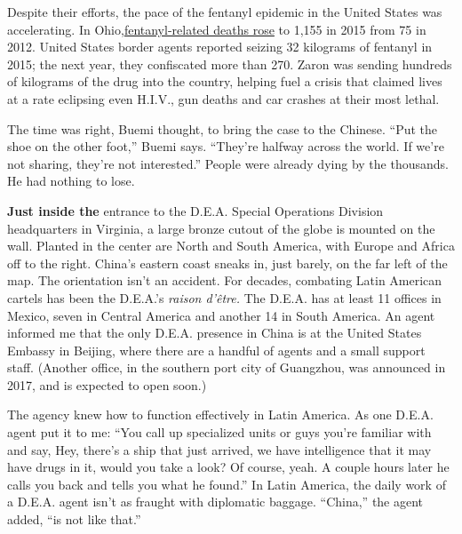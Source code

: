 Despite their efforts, the pace of the fentanyl epidemic in the United
States was accelerating. In
Ohio,\href{https://www.nytimes3xbfgragh.onion/2018/04/04/opinion/carfentanil-fentanyl-opioid-crisis.html}{fentanyl-related
deaths rose} to 1,155 in 2015 from 75 in 2012. United States border
agents reported seizing 32 kilograms of fentanyl in 2015; the next year,
they confiscated more than 270. Zaron was sending hundreds of kilograms
of the drug into the country, helping fuel a crisis that claimed lives
at a rate eclipsing even H.I.V., gun deaths and car crashes at their
most lethal.

The time was right, Buemi thought, to bring the case to the Chinese.
``Put the shoe on the other foot,'' Buemi says. ``They're halfway across
the world. If we're not sharing, they're not interested.'' People were
already dying by the thousands. He had nothing to lose.

\textbf{Just inside the} entrance to the D.E.A. Special Operations
Division headquarters in Virginia, a large bronze cutout of the globe is
mounted on the wall. Planted in the center are North and South America,
with Europe and Africa off to the right. China's eastern coast sneaks
in, just barely, on the far left of the map. The orientation isn't an
accident. For decades, combating Latin American cartels has been the
D.E.A.'s \emph{raison d'être.} The D.E.A. has at least 11 offices in
Mexico, seven in Central America and another 14 in South America. An
agent informed me that the only D.E.A. presence in China is at the
United States Embassy in Beijing, where there are a handful of agents
and a small support staff. (Another office, in the southern port city of
Guangzhou, was announced in 2017, and is expected to open soon.)

The agency knew how to function effectively in Latin America. As one
D.E.A. agent put it to me: ``You call up specialized units or guys
you're familiar with and say, Hey, there's a ship that just arrived, we
have intelligence that it may have drugs in it, would you take a look?
Of course, yeah. A couple hours later he calls you back and tells you
what he found.'' In Latin America, the daily work of a D.E.A. agent
isn't as fraught with diplomatic baggage. ``China,'' the agent added,
``is not like that.''


